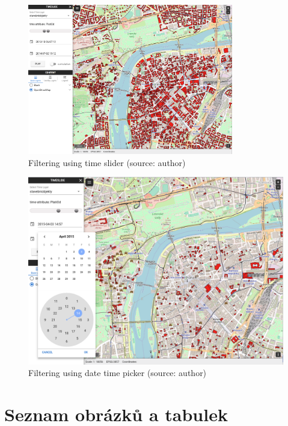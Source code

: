 \begin{figure}[h!]
	\centering
	\includegraphics[width=0.8\textwidth]{../img/prague-filter.png}
	\caption{Filtering using time slider (source: author)}
	\label{fig:prague-filter}
\end{figure}

\newpage
\begin{figure}[h!]
	\centering
	\includegraphics[width=1\textwidth]{../img/prague-picker.png}
	\caption{Filtering using date time picker (source: author)}
	\label{fig:prague-picker}
\end{figure}

\newpage
\section{Seznam obrázků a tabulek}
\listoffigures
\listoftables



